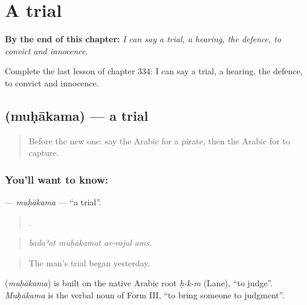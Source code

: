 
\chapter{A trial}
\label{ch:ar-a-trial}

\begin{chapteropening}
\textbf{By the end of this chapter:} \emph{I can say a trial, a hearing, the defence, to convict and innocence.}

Complete the last lesson of chapter 334: I can say a trial, a hearing, the defence, to convict and innocence.
\end{chapteropening}

\section[\texorpdfstring{\ar{محاكمة} (muḥākama)}{محاكمة (muḥākama)}]{ (muḥākama) — a trial}

\label{lesson:AR-C334-muhakama}



\begin{quote}
Before the new one: say the Arabic for a pirate, then the Arabic for to capture.
\end{quote}

\subsection*{You'll want to know: }
\textbf{} — \emph{muḥākama} — \textquotedblleft{}a trial\textquotedblright{}.

\begin{quote}
   .
\end{quote}

\begin{quote}
\emph{badaʾat muḥākamat ar-rajul ams.}
\end{quote}

\begin{quote}
The man’s trial began yesterday.
\end{quote}

\begin{cousinweb}
\textbf{} (\emph{muḥākama}) is built on the native Arabic root \emph{ḥ-k-m} (Lane), \textquotedblleft{}to judge\textquotedblright{}. \emph{Muḥākama} is the verbal noun of Form III, \textquotedblleft{}to bring someone to judgment\textquotedblright{}.
\end{cousinweb}

